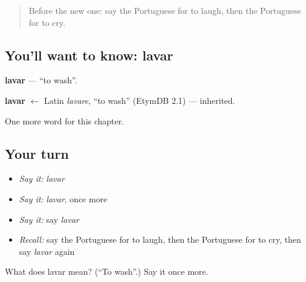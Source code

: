 \begin{quote}
Before the new one: say the Portuguese for to laugh, then the Portuguese for to cry.
\end{quote}

\subsection*{You'll want to know: lavar}
\textbf{lavar} — \textquotedblleft{}to wash\textquotedblright{}.

\begin{cousinweb}
\textbf{lavar} $\leftarrow$ Latin \emph{lavare}, \textquotedblleft{}to wash\textquotedblright{} (EtymDB 2.1) — inherited.
\end{cousinweb}

\begin{grammarlens}[title={What you've built}]
One more word for this chapter.
\end{grammarlens}

\subsection*{Your turn}
\begin{itemize}
\raggedright
  \item \emph{Say it:} \emph{lavar}
  \item \emph{Say it:} \emph{lavar}, once more
  \item \emph{Say it:} say \emph{lavar}
  \item \emph{Recall:} say the Portuguese for to laugh, then the Portuguese for to cry, then say \emph{lavar} again
\end{itemize}

\begin{tcolorbox}[breakable,colback=teal!4,colframe=teal!35!black,title={Before you move on}]
What does lavar mean? (\textquotedblleft{}To wash\textquotedblright{}.) Say it once more.
\end{tcolorbox}
